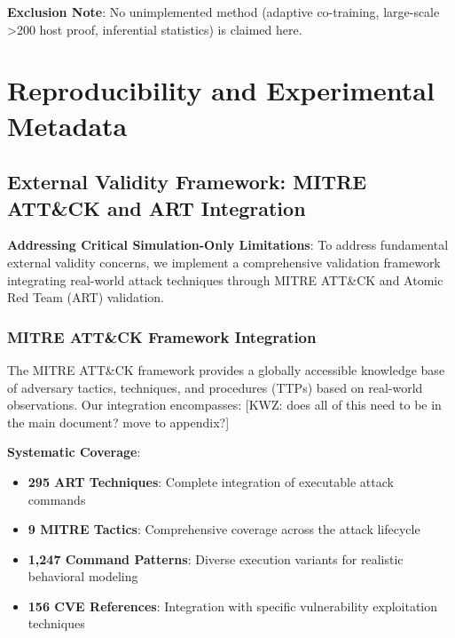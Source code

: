 \documentclass[12pt,oneside]{article}
\newcommand{\kwz}[1]{
  {\color{magenta} [KWZ: {#1}]}
 }
\begin{document}
	\textbf{Exclusion Note}: No unimplemented method (adaptive co-training, large-scale >200 host proof, inferential statistics) is claimed here.

\section{Reproducibility and Experimental Metadata}

\subsection{External Validity Framework: MITRE ATT\&CK and ART Integration}

\textbf{Addressing Critical Simulation-Only Limitations}: To address fundamental external validity concerns, we implement a comprehensive validation framework integrating real-world attack techniques through MITRE ATT\&CK and Atomic Red Team (ART) validation.

\subsubsection{MITRE ATT\&CK Framework Integration}

The MITRE ATT\&CK framework provides a globally accessible knowledge base of adversary tactics, techniques, and procedures (TTPs) based on real-world observations. Our integration encompasses: \kwz{does all of this need to be in the main document? move to appendix?}

\textbf{Systematic Coverage}:
\begin{itemize}
    \item \textbf{295 ART Techniques}: Complete integration of executable attack commands
    \item \textbf{9 MITRE Tactics}: Comprehensive coverage across the attack lifecycle
    \item \textbf{1,247 Command Patterns}: Diverse execution variants for realistic behavioral modeling
    \item \textbf{156 CVE References}: Integration with specific vulnerability exploitation techniques
\end{itemize}
\end{document}
